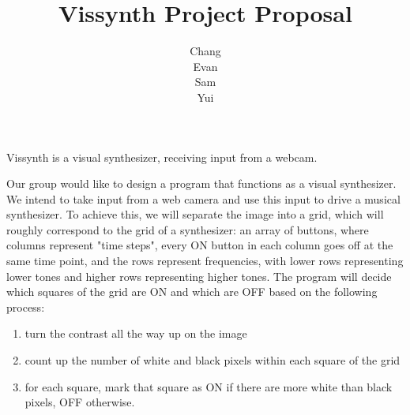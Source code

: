 \documentclass{article}
\title{Vissynth Project Proposal}
\author{Chang \\ Evan \\ Sam \\ Yui}
\begin{document}
\maketitle

Vissynth is a visual synthesizer, receiving input from a webcam. 

Our group would like to design a program that functions as a
visual synthesizer. We intend to take input from a web camera and
use this input to drive a musical synthesizer. To achieve this, we
will separate the image into a grid, which will roughly correspond
to the grid of a synthesizer: an array of buttons, where columns
represent "time steps", every ON button in each column goes off at
the same time point, and the rows represent frequencies, with
lower rows representing lower tones and higher rows representing
higher tones. The program will decide which squares of the grid
are ON and which are OFF based on the following process:

\begin{enumerate}
  \item turn the contrast all the way up on the image
  \item count up the number of white and black pixels within each square of the grid
  \item for each square, mark that square as ON if there are more white than black pixels, OFF otherwise.
\end{enumerate}
\end{document}
